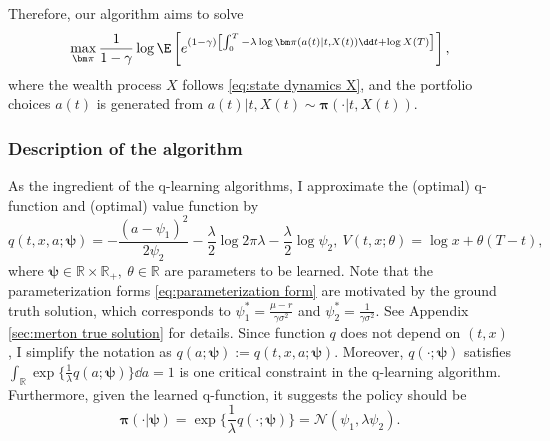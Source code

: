 Therefore, our algorithm aims to solve
\begin{equation}
	\label{eq:risk sensitive rl crra}
	\max_{\bm\pi}\frac{1}{1-\gamma}\log\E\left[ e^{(1-\gamma)\left[ \int_0^T -\lambda\log\bm\pi\left( a(t) | t, X(t)  \right)\dd t + \log X(T)  \right]} \right],
\end{equation} 
where the wealth process $X$ follows \eqref{eq:state dynamics X}, and the portfolio choices $a(t)$ is generated from $a(t)|t,X(t) \sim \bm\pi\left( \cdot|t, X(t) \right)$.


\subsubsection{Description of the algorithm}

As the ingredient of the q-learning algorithms, I approximate the (optimal) q-function and (optimal) value function by
\begin{equation}
	\label{eq:parameterization form}
	q(t,x,a;\bm\psi) = -\frac{(a - \psi_1)^2}{2\psi_2} - \frac{\lambda}{2}\log2\pi\lambda - \frac{\lambda}{2}\log\psi_2,\ V(t,x;\theta) = \log x + \theta (T-t) ,
\end{equation}
where $\bm\psi\in \mathbb{R}\times \mathbb{R}_+,\ \theta\in \mathbb R$ are parameters to be learned. Note that the parameterization forms \eqref{eq:parameterization form} are motivated by the ground truth solution, which corresponds to $\psi_1^* = \frac{\mu-r}{\gamma\sigma^2}$ and $\psi_2^* = \frac{1}{\gamma \sigma^2}$. See Appendix \ref{sec:merton true solution} for details. Since function $q$ does not depend on $(t,x)$, I simplify the notation as $q(a;\bm\psi):=q(t,x,a;\bm\psi)$. Moreover, $q(\cdot;\bm\psi)$ satisfies $\int_{\mathbb R} \exp\{ \frac{1}{\lambda} q(a;\bm\psi)  \} \dd a = 1$ is one critical constraint in the q-learning algorithm. Furthermore, given the learned q-function, it suggests the policy should be 
\[ \bm\pi(\cdot|\bm\psi) =  \exp\{ \frac{1}{\lambda} q(\cdot;\bm\psi) \} = \mathcal{N}( \psi_1, \lambda \psi_2) . \]



